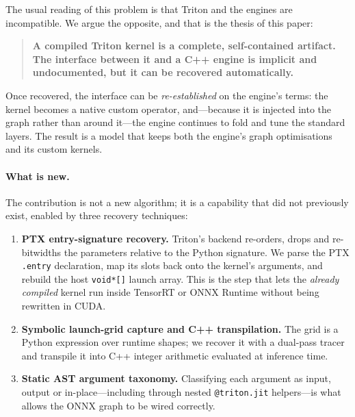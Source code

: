 \documentclass[10pt]{article}
\begin{document}
The usual reading of this problem is that Triton and the engines are
incompatible. We argue the opposite, and that is the thesis of this paper:

\begin{quote}
\textbf{A compiled Triton kernel is a complete, self-contained artifact. The
interface between it and a C++ engine is implicit and undocumented, but it can be
recovered automatically.}
\end{quote}

Once recovered, the interface can be \emph{re-established} on the engine's terms:
the kernel becomes a native custom operator, and---because it is injected into
the graph rather than around it---the engine continues to fold and tune the
standard layers. The result is a model that keeps both the engine's graph
optimisations and its custom kernels.

\paragraph{What is new.} The contribution is not a new algorithm; it is a
capability that did not previously exist, enabled by three recovery techniques:

\begin{enumerate}[leftmargin=1.6em]
    \item \textbf{PTX entry-signature recovery.} Triton's backend re-orders,
    drops and re-bitwidths the parameters relative to the Python signature. We
    parse the PTX \texttt{.entry} declaration, map its slots back onto the
    kernel's arguments, and rebuild the host \texttt{void*[]} launch array. This
    is the step that lets the \emph{already compiled} kernel run inside TensorRT
    or ONNX Runtime without being rewritten in CUDA.
    \item \textbf{Symbolic launch-grid capture and C++ transpilation.} The grid
    is a Python expression over runtime shapes; we recover it with a dual-pass
    tracer and transpile it into C++ integer arithmetic evaluated at inference
    time.
    \item \textbf{Static AST argument taxonomy.} Classifying each argument as
    input, output or in-place---including through nested \texttt{@triton.jit}
    helpers---is what allows the ONNX graph to be wired correctly.
\end{enumerate}
\end{document}
